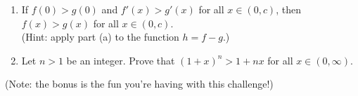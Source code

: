 \documentclass[12pt]{article}
\begin{document}
\begin{enumerate}
\begin{enumerate}
\vspace{3in}

 \item If $f(0)>g(0)$ and $f'(x)>g'(x)$ for all $x\in (0,c)$, then $f(x)>g(x)$ for all $x\in (0,c)$.\\
(Hint: apply part (a) to the function $h=f-g$.)

\vspace{2in}

 \item Let $n>1$ be an integer. Prove that $(1+x)^n>1+nx$ for all $x\in(0,\infty)$.
\end{enumerate}

\vspace*{\fill}

(Note: the bonus is the fun you're having with this challenge!)
\end{enumerate}
\end{document}
